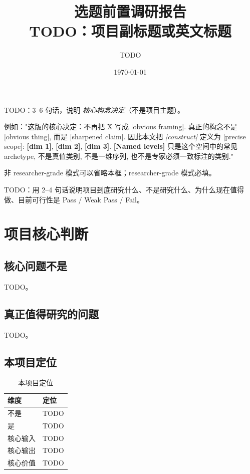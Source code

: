 \documentclass[UTF8,a4paper,11pt]{ctexart}
\title{\vspace{-1.5cm}\textbf{选题前置调研报告}\\[0.5em]\large TODO：项目副标题或英文标题}
\author{TODO}
\date{\today}
\begin{document}
\maketitle

\begin{tcolorbox}[thesisbox,title=核心构念决定]
TODO：3--6 句话，说明 \emph{核心构念决定}（不是项目主题）。

例如："这版的核心决定：不再把 X 写成 [obvious framing]. 真正的构念不是 [obvious thing], 而是 [sharpened claim]. 因此本文把 \textit{[construct]} 定义为 [precise scope]: \textbf{[dim 1]}, \textbf{[dim 2]}, \textbf{[dim 3]}. \textbf{[Named levels]} 只是这个空间中的常见 archetype, 不是真值类别, 不是一维序列, 也不是专家必须一致标注的类别."

非 researcher-grade 模式可以省略本框；researcher-grade 模式必填。
\end{tcolorbox}

\begin{tcolorbox}[mybox,title=一句话概括]
TODO：用 2--4 句话说明项目到底研究什么、不是研究什么、为什么现在值得做、目前可行性是 Pass / Weak Pass / Fail。
\end{tcolorbox}

\tableofcontents
\newpage

\section{项目核心判断}

\subsection{核心问题不是}

TODO。

\subsection{真正值得研究的问题}

\begin{tcolorbox}[keybox,title=核心研究问题]
TODO。
\end{tcolorbox}

\subsection{本项目定位}

\begin{table}[H]
\centering
\caption{本项目定位}
\begin{tabularx}{\textwidth}{p{3cm}X}
\toprule
\textbf{维度} & \textbf{定位} \\
\midrule
不是 & TODO \\
是 & TODO \\
核心输入 & TODO \\
核心输出 & TODO \\
核心价值 & TODO \\
\bottomrule
\end{tabularx}
\end{table}
\end{document}
